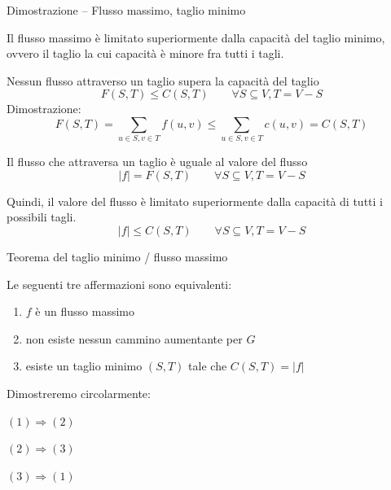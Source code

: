 \begin{frame}{Dimostrazione -- Flusso massimo, taglio minimo}

\vspace{-3pt}
\begin{myboxtitle}
Il \alert{flusso massimo} è limitato superiormente dalla capacità del \alert{taglio minimo}, ovvero il taglio la cui capacità è minore fra tutti i tagli.
\end{myboxtitle}

\begin{overprint}

\medskip
\BIL
\item Nessun flusso attraverso un taglio supera la capacità del taglio
\smallskip
\[
  F(S,T) \leq C(S,T) \qquad \forall S \subseteq V, T = V-S
\]
Dimostrazione:
\smallskip
\[
  F(S,T) = \sum_{u \in S, v \in T} f(u,v) \leq \sum_{u \in S, v \in T} c(u,v) = C(S,T)
\]
\item Il flusso che attraversa un taglio è uguale al valore del flusso
\smallskip
\[
  |f| = F(S,T) \qquad \forall S \subseteq V, T = V-S
\]
\EIL
{}

\medskip
\BIL
\item Quindi, il valore del flusso è limitato superiormente dalla capacità
di tutti i possibili tagli. 
\smallskip
\[
|f| \leq C(S,T) \qquad \forall S \subseteq V, T = V-S
\]
\EIL
\end{overprint}

\end{frame}

\begin{frame}{Teorema del taglio minimo / flusso massimo}

\vspace{-9pt}
\begin{myboxtitle}[Teorema]
Le seguenti tre affermazioni sono equivalenti:
\begin{enumerate}
\item $f$ è un \alert{flusso massimo}
\item non esiste nessun cammino aumentante per $G$
\item esiste un \alert{taglio minimo} $(S,T)$ tale che $C(S,T) = |f|$
\end{enumerate}
\end{myboxtitle}

\bigskip
Dimostreremo circolarmente:
\BIL
\item $(1) \Rightarrow (2)$
\item $(2) \Rightarrow (3)$
\item $(3) \Rightarrow (1)$
\EIL

\end{frame}

